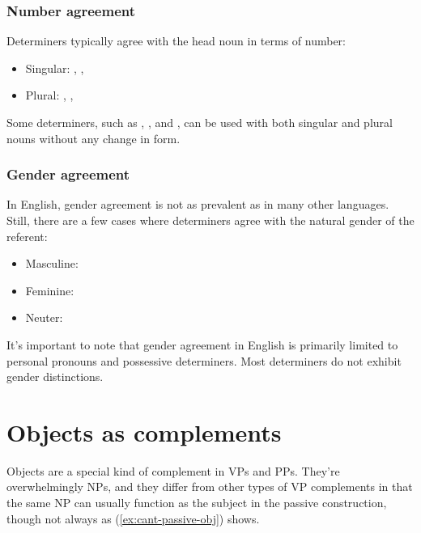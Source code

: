 \subsubsection{Number agreement}
Determiners typically agree with the head noun in terms of number:

\begin{itemize}[noitemsep]
   \item Singular: , , 
   \item Plural: , , 
\end{itemize}

Some determiners, such as , , and , can be used with both singular and plural nouns without any change in form.

\subsubsection{Gender agreement}
In English, gender agreement is not as prevalent as in many other languages. Still, there are a few cases where determiners agree with the natural gender of the referent:

\begin{itemize}[noitemsep]
   \item Masculine: 
   \item Feminine: 
   \item Neuter: 
\end{itemize}

It's important to note that gender agreement in English is primarily limited to personal pronouns and possessive determiners. Most determiners do not exhibit gender distinctions.

\section{Objects as complements}

Objects are a special kind of complement in VPs and PPs. They're overwhelmingly NPs, and they differ from other types of VP complements in that the same NP can usually function as the subject in the passive construction, though not always as (\ref{ex:cant-passive-obj}) shows.

